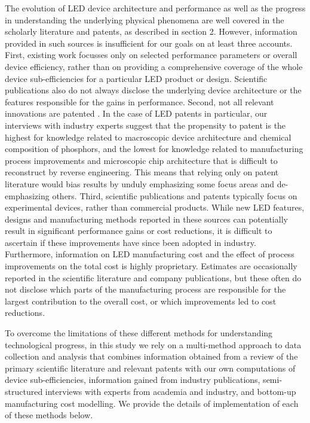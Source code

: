 \documentclass[twoside,twocolumn,9pt]{article}
\begin{document}
The evolution of LED device architecture and performance as well as the progress in understanding the underlying physical phenomena are well covered in the scholarly literature and patents, as described in section 2. However, information provided in such sources is insufficient for our goals on at least three accounts. First, existing work focusses  only on selected performance parameters or overall device efficiency, rather than on providing a comprehensive coverage of the whole device sub-efficiencies for a particular LED product or design. Scientific publications also do not always disclose the underlying device architecture or the features responsible for the gains in performance. Second, not all relevant innovations are patented \cite{Pakes_1980}\cite{ Fontana_2013}. In the case of LED patents in particular, our interviews with industry experts suggest that the propensity to patent is the highest for knowledge related to macroscopic device architecture and chemical composition of phosphors, and the lowest for knowledge related to manufacturing process improvements and microscopic chip architecture that is difficult to reconstruct by reverse engineering. This means that relying only on patent literature would bias results by unduly emphasizing some focus areas and de-emphasizing others. Third, scientific publications and patents typically focus on experimental devices, rather than commercial products. While new LED features, designs and manufacturing methods reported in these sources can potentially result in significant performance gains or cost reductions, it is difficult to ascertain if these improvements have since been adopted in industry.  Furthermore, information on LED manufacturing cost and the effect of process improvements on the total cost is highly proprietary. Estimates are occasionally reported in the scientific literature and company publications, but these often do not disclose which parts of the manufacturing process are responsible for the largest contribution to the overall cost, or which improvements led to cost reductions.

To overcome the limitations of these different methods for understanding technological progress, in this study we rely on a multi-method approach to data collection and analysis that combines information obtained from a review of the primary scientific literature and relevant patents with our own computations of device sub-efficiencies, information gained from industry publications, semi-structured interviews with experts from academia and industry, and bottom-up manufacturing cost modelling. We provide the details of implementation of each of these methods below.
\end{document}
